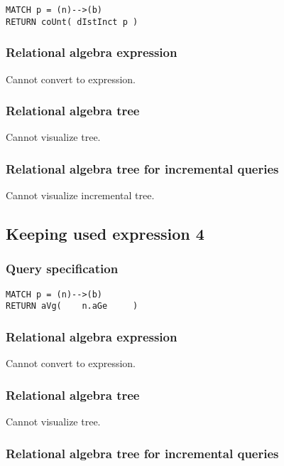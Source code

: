 \begin{lstlisting}
MATCH p = (n)-->(b)
RETURN coUnt( dIstInct p )
\end{lstlisting}

\subsubsection*{Relational algebra expression}

Cannot convert to expression.

\subsubsection*{Relational algebra tree}

Cannot visualize tree.

\subsubsection*{Relational algebra tree for incremental queries}

Cannot visualize incremental tree.

\subsection{Keeping used expression 4}

\subsubsection*{Query specification}

\begin{lstlisting}
MATCH p = (n)-->(b)
RETURN aVg(    n.aGe     )
\end{lstlisting}

\subsubsection*{Relational algebra expression}

Cannot convert to expression.

\subsubsection*{Relational algebra tree}

Cannot visualize tree.

\subsubsection*{Relational algebra tree for incremental queries}


